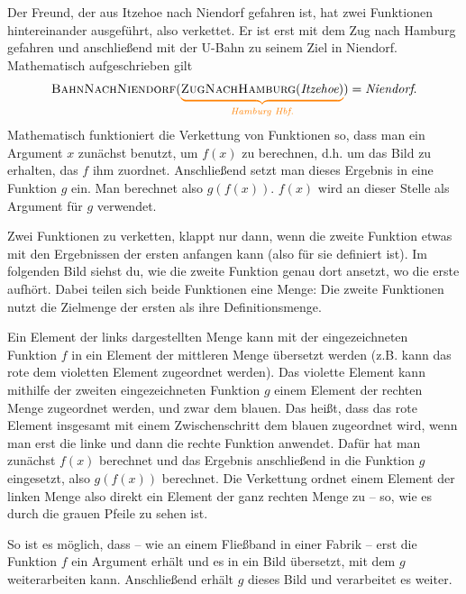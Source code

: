 \documentclass[../../main.tex]{subfiles}
\begin{document}
\begin{example}{}
    Der Freund, der aus Itzehoe nach Niendorf gefahren ist, hat zwei Funktionen hintereinander ausgeführt, also verkettet. Er ist erst mit dem Zug nach Hamburg gefahren und anschließend mit der U-Bahn zu seinem Ziel in Niendorf. Mathematisch aufgeschrieben gilt \[\textsc{BahnNachNiendorf}(\colorbrace{\textsc{ZugNachHamburg}(\emph{Itzehoe})}{\emph{Hamburg Hbf.}})=\emph{Niendorf}.\]
\end{example}

Mathematisch funktioniert die Verkettung von Funktionen so, dass man ein Argument $x$ zunächst benutzt, um $f(x)$ zu berechnen, d.h. um das Bild zu erhalten, das $f$ ihm zuordnet. Anschließend setzt man dieses Ergebnis in eine Funktion $g$ ein. Man berechnet also $g(f(x))$. $f(x)$ wird an dieser Stelle als Argument für $g$ verwendet.

Zwei Funktionen zu verketten, klappt nur dann, wenn die zweite Funktion etwas mit den Ergebnissen der ersten anfangen kann (also für sie definiert ist). Im folgenden Bild siehst du, wie die zweite Funktion genau dort ansetzt, wo die erste aufhört. Dabei teilen sich beide Funktionen eine Menge: Die zweite Funktionen nutzt die Zielmenge der ersten als ihre Definitionsmenge.

\parpic[r]{
    
}

Ein Element der links dargestellten Menge kann mit der eingezeichneten Funktion $f$ in ein Element der mittleren Menge übersetzt werden (z.B. kann das rote dem violetten Element zugeordnet werden). Das violette Element kann mithilfe der zweiten eingezeichneten Funktion $g$ einem Element der rechten Menge zugeordnet werden, und zwar dem blauen. Das heißt, dass das rote Element insgesamt mit einem Zwischenschritt dem blauen zugeordnet wird, wenn man erst die linke und dann die rechte Funktion anwendet. Dafür hat man zunächst $f(x)$ berechnet und das Ergebnis anschließend in die Funktion $g$ eingesetzt, also $g(f(x))$ berechnet. Die Verkettung ordnet einem Element der linken Menge also direkt ein Element der ganz rechten Menge zu -- so, wie es durch die grauen Pfeile zu sehen ist.

So ist es möglich, dass -- wie an einem Fließband in einer Fabrik -- erst die Funktion $f$ ein Argument erhält und es in ein Bild übersetzt, mit dem $g$ weiterarbeiten kann. Anschließend erhält $g$ dieses Bild und verarbeitet es weiter.
\end{document}

